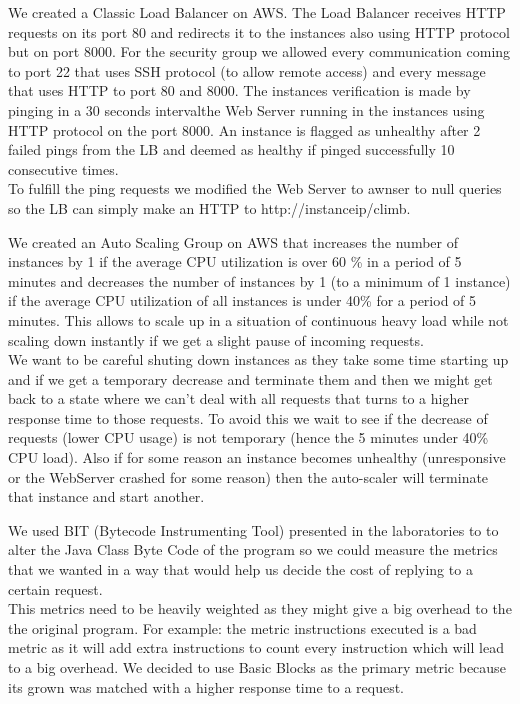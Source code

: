 \documentclass[times, 10pt,twocolumn]{article}
\begin{document}
   We created a Classic Load Balancer on AWS. The Load Balancer receives HTTP
   requests on its port 80 and redirects it to the instances also using HTTP
   protocol but on port 8000. For the security group we allowed every communication
   coming to port 22 that uses SSH protocol (to allow remote access) and every
   message that uses HTTP to port 80 and 8000. The instances verification is made 
   by pinging in a 30 seconds intervalthe Web Server running in the instances 
   using HTTP protocol on the port 8000. An instance is flagged as unhealthy after
   2 failed pings from the LB and deemed as healthy if pinged successfully 10 consecutive 
   times.\\
   To fulfill the ping requests we modified the Web Server to awnser to null queries
   so the LB can simply make an HTTP to http://instanceip/climb.
   
   We created an Auto Scaling Group on AWS that increases the number of instances by
   1 if the average CPU utilization is over 60 \% in a period of 5 minutes and
   decreases the number of instances by 1 (to a minimum of 1 instance) if the average CPU 
   utilization of all instances is under 40\% for a period of 5 minutes. This allows
   to scale up in a situation of continuous heavy load while not scaling down instantly
   if we get a slight pause of incoming requests. \\
   We want to be careful shuting down instances as they take some time starting up and if 
   we get a temporary decrease and terminate them and then we might get back to a state
   where we can't deal with all requests that turns to a higher response time to those 
   requests. To avoid this we wait to see if the decrease of requests (lower CPU usage)
   is not temporary (hence the 5 minutes under 40\% CPU load). Also if for some reason
   an instance becomes unhealthy (unresponsive or the WebServer crashed for some reason)
   then the auto-scaler will terminate that instance and start another.

   We used BIT (Bytecode Instrumenting Tool) presented in the laboratories to 
   to alter the Java Class Byte Code of the program so we could measure the metrics
   that we wanted in a way that would help us decide the cost of replying to a certain request.\\
   This metrics need to be heavily weighted as they might give a big overhead to the 
   the original program. For example: the metric instructions executed is a bad metric
   as it will add extra instructions to count every instruction which will lead to a 
   big overhead.
   We decided to use Basic Blocks as the primary metric because its grown 
   was matched with a higher response time to a request. 
\end{document}
